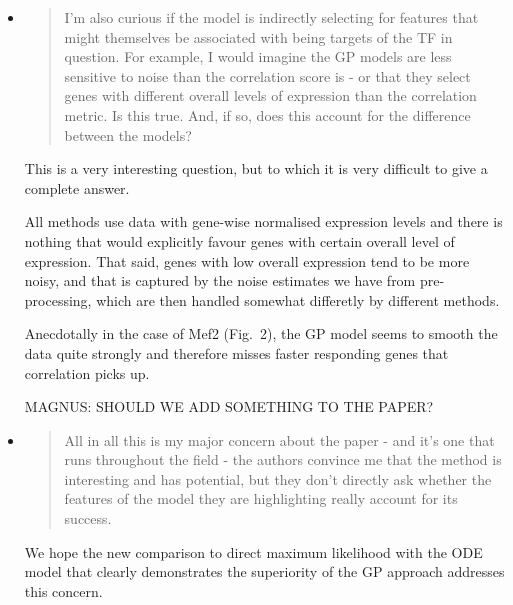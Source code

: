 \documentclass{article}
\begin{document}
\begin{itemize}
\item \begin{quote} I'm also curious if the model is indirectly
    selecting for features that might themselves be associated with
    being targets of the TF in question. For example, I would imagine
    the GP models are less sensitive to noise than the correlation
    score is - or that they select genes with different overall levels
    of expression than the correlation metric. Is this true. And, if
    so, does this account for the difference between the models?
\end{quote}

This is a very interesting question, but to which it is very difficult
to give a complete answer.

All methods use data with gene-wise normalised expression levels and
there is nothing that would explicitly favour genes with certain
overall level of expression.  That said, genes with low overall
expression tend to be more noisy, and that is captured by the noise
estimates we have from pre-processing, which are then handled somewhat
differetly by different methods.

Anecdotally in the case of Mef2 (Fig.~2), the GP model seems to smooth
the data quite strongly and therefore misses faster responding genes
that correlation picks up.

MAGNUS: SHOULD WE ADD SOMETHING TO THE PAPER?

\item \begin{quote} All in all this is my major concern about the
    paper - and it's one that runs throughout the field - the authors
    convince me that the method is interesting and has potential, but
    they don't directly ask whether the features of the model they are
    highlighting really account for its success.
\end{quote}

We hope the new comparison to direct maximum likelihood with the ODE
model that clearly demonstrates the superiority of the GP approach
addresses this concern.

\end{itemize}
\end{document}
